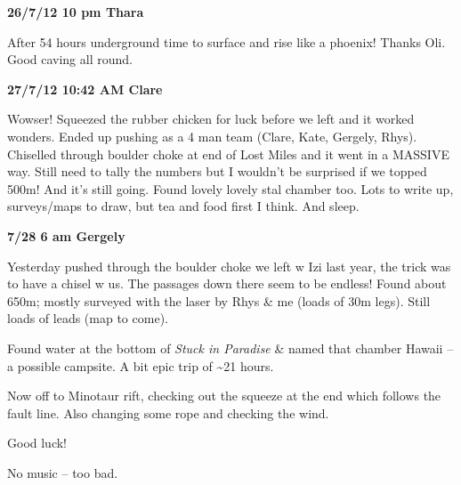 \textbf{26/7/12 10 pm Thara}

After 54 hours underground time to surface and rise like a phoenix!
Thanks Oli. Good caving all round.

\textbf{27/7/12 10:42 AM Clare}

Wowser! Squeezed the rubber chicken for luck before we left and it
worked wonders. Ended up pushing as a 4 man team (Clare, Kate, Gergely,
Rhys). Chiselled through boulder choke at end of Lost Miles and it went
in a MASSIVE way. Still need to tally the numbers but I wouldn't be
surprised if we topped 500m! And it's still going. Found lovely lovely
stal chamber too. Lots to write up, surveys/maps to draw, but tea and
food first I think. And sleep.

\textbf{7/28 6 am Gergely}

Yesterday pushed through the boulder choke we left w Izi last year, the
trick was to have a chisel w us. The passages down there seem to be
endless! Found about 650m; mostly surveyed with the laser by Rhys \& me
(loads of 30m legs). Still loads of leads (map to come).

Found water at the bottom of \emph{Stuck in Paradise} \& named that
chamber Hawaii -- a possible campsite. A bit epic trip of
\textasciitilde{}21 hours.

Now off to Minotaur rift, checking out the squeeze at the end which
follows the fault line. Also changing some rope and checking the wind.

Good luck!

No music -- too bad.

